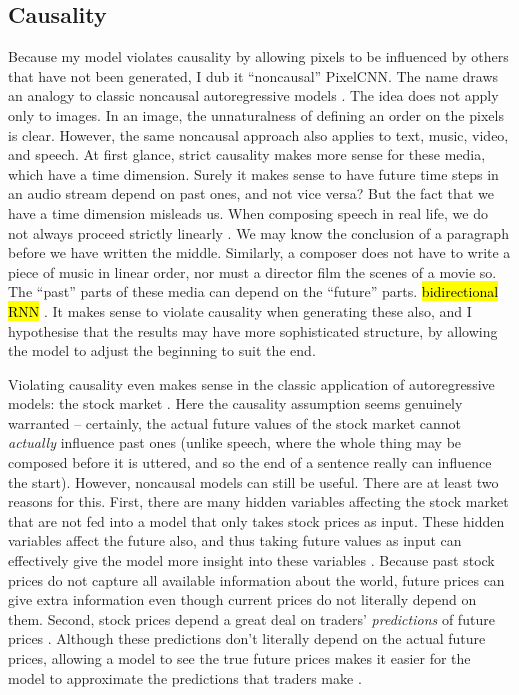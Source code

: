 \documentclass[10pt,a4paper]{article}
\newcommand{\nquote}[1]{``{#1}''}
\begin{document}
\subsection{Causality}

Because my model violates causality by allowing pixels to be influenced by others that have not been generated, I dub it \nquote{noncausal} PixelCNN. The name draws an analogy to classic noncausal autoregressive models \cite{??,??}. The idea does not apply only to images. In an image, the unnaturalness of defining an order on the pixels is clear. However, the same noncausal approach also applies to text, music, video, and speech. At first glance, strict causality makes more sense for these media, which have a time dimension. Surely it makes sense to have future time steps in an audio stream depend on past ones, and not vice versa? But the fact that we have a time dimension misleads us. When composing speech in real life, we do not always proceed strictly linearly \cite{??}. We may know the conclusion of a paragraph before we have written the middle. Similarly, a composer does not have to write a piece of music in linear order, nor must a director film the scenes of a movie so. The \nquote{past} parts of these media can depend on the \nquote{future} parts. \hl{bidirectional RNN} \cite{??}. It makes sense to violate causality when generating these also, and I hypothesise that the results may have more sophisticated structure, by allowing the model to adjust the beginning to suit the end.

Violating causality even makes sense in the classic application of autoregressive models: the stock market \cite{??}. Here the causality assumption seems genuinely warranted -- certainly, the actual future values of the stock market cannot \emph{actually} influence past ones (unlike speech, where the whole thing may be composed before it is uttered, and so the end of a sentence really can influence the start). However, noncausal models can still be useful. There are at least two reasons for this. First, there are many hidden variables affecting the stock market that are not fed into a model that only takes stock prices as input. These hidden variables affect the future also, and thus taking future values as input can effectively give the model more insight into these variables \cite{??}. Because past stock prices do not capture all available information about the world, future prices can give extra information even though current prices do not literally depend on them. Second, stock prices depend a great deal on traders' \emph{predictions} of future prices \cite{??}. Although these predictions don't literally depend on the actual future prices, allowing a model to see the true future prices makes it easier for the model to approximate the predictions that traders make \cite{??}.
\end{document}
